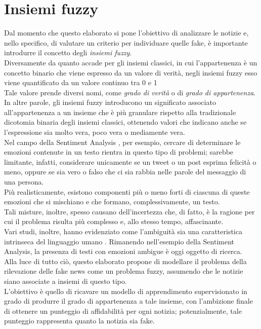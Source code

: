 \documentclass[12pt]{report}
\theoremstyle{definition}
\begin{document}
\section{Insiemi fuzzy} \label{insiemifuzzy}
Dal momento che questo elaborato si pone l'obiettivo di analizzare le notizie e, nello specifico, di valutare un criterio per individuare quelle fake, è importante introdurre il concetto degli \textit{insiemi fuzzy}.
\\
Diversamente da quanto accade per gli insiemi classici, in cui l'appartenenza  è un concetto binario che viene espresso da un valore di verità, negli insiemi fuzzy esso viene quantificato da un valore continuo tra 0 e 1
\\
Tale valore prende diversi nomi, come \textit{grado di verità} o di \textit{grado di appartenenza}.
\\
In altre parole, gli insiemi fuzzy introducono un significato associato all'appartenenza a un insieme che è più granulare rispetto alla tradizionale dicotomia binaria degli insiemi classici, ottenendo valori che indicano anche se l'espressione sia molto vera, poco vera o mediamente vera.
\\
Nel campo della Sentiment Analysis \cite{25}, per esempio, cercare di determinare le emozioni contenute in un testo rientra in questo tipo di problemi; sarebbe limitante, infatti, considerare unicamente se un tweet o un post esprima felicità o meno, oppure se sia vero o falso che ci sia rabbia nelle parole del messaggio di una persona.
\\
Più realisticamente, esistono componenti più o meno forti di ciascuna di queste emozioni che si mischiano e che formano, complessivamente, un testo.
\\
Tali misture, inoltre, spesso causano dell'incertezza che, di fatto, è la ragione per cui il problema risulta più complesso e, allo stesso tempo, affascinante.
\\
Vari studi, inoltre, hanno evidenziato come l'ambiguità sia una caratteristica intrinseca del linguaggio umano \cite{26, 27}.
Rimanendo nell'esempio della Sentiment Analysis, la presenza di testi con emozioni ambigue è oggi oggetto di ricerca.
\\
Alla luce di tutto ciò, questo elaborato propone di modellare il problema della rilevazione delle fake news come un problema fuzzy, assumendo che le notizie siano associate a insiemi di questo tipo.
\\
L'obiettivo è quello di ricavare un modello di apprendimento supervisionato in grado di produrre il grado di appartenenza a tale insieme, con l'ambizione finale di ottenere un punteggio di affidabilità per ogni notizia;
potenzialmente, tale punteggio rappresenta quanto la notizia sia fake.
\end{document}
